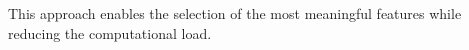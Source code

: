 


This approach enables the selection of the most meaningful features while reducing the computational load.






